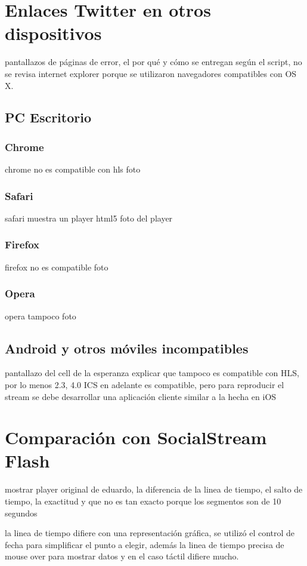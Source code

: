 \section{Enlaces Twitter en otros dispositivos}
	pantallazos de páginas de error, el por qué y cómo se entregan según el script, no se revisa internet explorer porque se utilizaron navegadores compatibles con OS X.
	
  \subsection{PC Escritorio}
    \subsubsection{Chrome}
    chrome no es compatible con hls
    foto
    \subsubsection{Safari}
    safari muestra un player html5
    foto del player
    \subsubsection{Firefox}
    firefox no es compatible
    foto
    \subsubsection{Opera}
    opera tampoco
    foto
  \subsection{Android y otros móviles incompatibles}
  pantallazo del cell de la esperanza
  explicar que tampoco es compatible con HLS, por lo menos 2.3, 4.0 ICS en adelante es compatible, pero para reproducir el stream se debe desarrollar una aplicación cliente similar a la hecha en iOS
\section{Comparación con SocialStream Flash}
mostrar player original de eduardo, la diferencia de la linea de tiempo, el salto de tiempo, la exactitud y que no es tan exacto porque los segmentos son de 10 segundos

la linea de tiempo difiere con una representación gráfica, se utilizó el control de fecha para simplificar el punto a elegir, además la linea de tiempo precisa de mouse over para mostrar datos y en el caso táctil difiere mucho.


